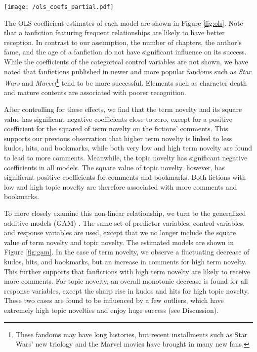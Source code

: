 \documentclass[letterpaper]{article} %
\begin{document}
\begin{figure*}
    \centering
          \texttt{[image: /ols\_coefs\_partial.pdf]}
        \caption{OLS coefficients for the independent variables and selected control variables. 95\% confidence intervals are shown. The coefficients of the categorical variables are omitted.}
        \label{fig:ols}
\end{figure*}

The OLS coefficient estimates of each model are shown in Figure \ref{fig:ols}. Note that a fanfiction featuring frequent relationships are likely to have better reception. In contrast to our assumption, the number of chapters, the author's fame, and the age of a fanfiction do not have significant influence on its success. While the coefficients of the categorical control variables are not shown, we have noted that fanfictions published in newer and more popular fandoms such as \emph{Star Wars} and \emph{Marvel}\footnote{These fandoms may have long histories, but recent installments such as Star Wars' new triology and the Marvel movies have brought in many new fans.} tend to be more successful. Elements such as character death and mature contents are associated with poorer recognition. 

After controlling for these effects, we find that the term novelty and its square value has significant negative coefficients close to zero, except for a positive coefficient for the squared of term novelty on the fictions' comments. This supports our previous observation that higher term novelty is linked to less kudos, hits, and bookmarks, while both very low and high term novelty are found to lead to more comments. Meanwhile, the topic novelty has significant negative coefficients in all models. The square value of topic novelty, however, has significant positive coefficients for comments and bookmarks. Both fictions with low and high topic novelty are therefore associated with more comments and bookmarks. 

To more closely examine this non-linear relationship, we turn to the generalized additive models (GAM) \cite{wood2006generalized}. The same set of predictor variables, control variables, and response variables are used, except that we no longer include the square value of term novelty and topic novelty. The estimated models are shown in Figure \ref{fig:gam}. In the case of term novelty, we observe a fluctuating decrease of kudos, hits, and bookmarks, but an increase in comments for high term novelty. This further supports that fanfictions with high term novelty are likely to receive more comments. For topic novelty, an overall monotonic decrease is found for all response variables, except the sharp rise in kudos and hits for high topic novelty. These two cases are found to be influenced by a few outliers, which have extremely high topic novelties and enjoy huge success (see Discussion). 
\end{document}
